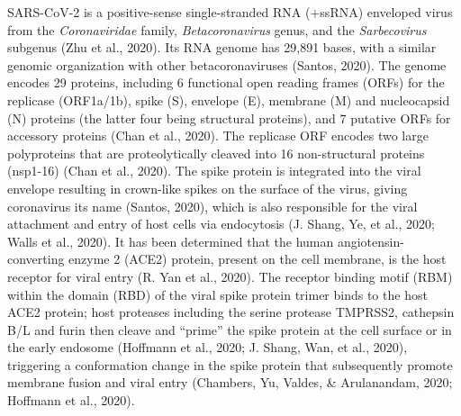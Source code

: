 \documentclass[12pt,twoside,openany,\mydriver]{thesis}  %
\begin{document}
SARS-CoV-2 is a positive-sense single-stranded RNA (+ssRNA) enveloped virus from the \emph{Coronaviridae} family, \emph{Betacoronavirus} genus, and the \emph{Sarbecovirus} subgenus (Zhu et al., 2020). Its RNA genome has 29,891 bases, with a similar genomic organization with other betacoronaviruses (Santos, 2020). The genome encodes 29 proteins, including 6 functional open reading frames (ORFs) for the replicase (ORF1a/1b), spike (S), envelope (E), membrane (M) and nucleocapsid (N) proteins (the latter four being structural proteins), and 7 putative ORFs for accessory proteins (Chan et al., 2020). The replicase ORF encodes two large polyproteins that are proteolytically cleaved into 16 non-structural proteins (nsp1-16) (Chan et al., 2020). The spike protein is integrated into the viral envelope resulting in crown-like spikes on the surface of the virus, giving coronavirus its name (Santos, 2020), which is also responsible for the viral attachment and entry of host cells via endocytosis (J. Shang, Ye, et al., 2020; Walls et al., 2020). It has been determined that the human angiotensin-converting enzyme 2 (ACE2) protein, present on the cell membrane, is the host receptor for viral entry (R. Yan et al., 2020). The receptor binding motif (RBM) within the domain (RBD) of the viral spike protein trimer binds to the host ACE2 protein; host proteases including the serine protease TMPRSS2, cathepsin B/L and furin then cleave and ``prime'' the spike protein at the cell surface or in the early endosome (Hoffmann et al., 2020; J. Shang, Wan, et al., 2020), triggering a conformation change in the spike protein that subsequently promote membrane fusion and viral entry (Chambers, Yu, Valdes, \& Arulanandam, 2020; Hoffmann et al., 2020).
\end{document}
